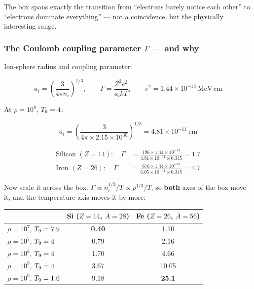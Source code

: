 The box spans exactly the transition from ``electrons barely notice each
other'' to ``electrons dominate everything'' --- not a coincidence, but the
physically interesting range.

\subsubsection{The Coulomb coupling parameter
  \texorpdfstring{$\Gamma$}{Gamma} --- and why
  \texorpdfstring{}{chugunov\_2007}}
\label{sec:gamma}

Ion-sphere radius and coupling parameter:

\begin{equation*}
a_i = \left(\frac{3}{4\pi n_i}\right)^{1/3}, \qquad
\Gamma = \frac{Z^2 e^2}{a_i kT}, \qquad
e^2 = 1.44\times10^{-13}\ \mathrm{MeV\,cm}
\end{equation*}

At $\rho = 10^{8}$, $T_{9} = 4$:

\begin{equation*}
a_i = \left(\frac{3}{4\pi\times 2.15\times10^{30}}\right)^{1/3}
    = 4.81\times10^{-11}\ \mathrm{cm}
\end{equation*}

\begin{align*}
\text{Silicon }(Z=14):\quad \Gamma &=
  \frac{196\times 1.44\times10^{-13}}{4.81\times10^{-11}\times 0.345} = 1.7\\
\text{Iron }(Z=26):\quad \Gamma &=
  \frac{676\times 1.44\times10^{-13}}{6.05\times10^{-11}\times 0.345} = 4.7
\end{align*}

Now scale it across the box. $\Gamma \propto n_i^{1/3}/T \propto \rho^{1/3}/T$,
so \textbf{both} axes of the box move it, and the temperature axis moves it by
more:

\begin{center}
\begin{tabular}{@{}l c c@{}}
\toprule
 & \textbf{Si ($Z=14$, $\bar{A}=28$)} & \textbf{Fe ($Z=26$, $\bar{A}=56$)} \\
\midrule
$\rho = 10^{7}$, $T_{9} = 7.9$ & \textbf{0.40} & 1.10 \\
$\rho = 10^{7}$, $T_{9} = 4$   & 0.79 & 2.16 \\
$\rho = 10^{8}$, $T_{9} = 4$   & 1.70 & 4.66 \\
$\rho = 10^{9}$, $T_{9} = 4$   & 3.67 & 10.05 \\
$\rho = 10^{9}$, $T_{9} = 1.6$ & 9.18 & \textbf{25.1} \\
\bottomrule
\end{tabular}
\end{center}

